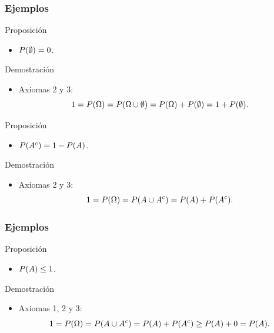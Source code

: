 \documentclass[table]{beamer}
\begin{document}
\begin{frame}
    \frametitle{Ejemplos}
    \begin{block}{Proposición}
        \begin{itemize}
            \item $\prob{\emptyset} = 0$.
        \end{itemize}
    \end{block}
    \begin{block}{Demostración}
        \begin{itemize}
            \item Axiomas 2 y 3:
                \begin{equation*}
                    1 = \prob{\Omega} = \prob{\Omega \cup \emptyset} = \prob{\Omega} + \prob{\emptyset} = 1 + \prob{\emptyset} .
                \end{equation*}
        \end{itemize}
    \end{block}
    \begin{block}{Proposición}
        \begin{itemize}
            \item $\prob{A^{c}} = 1 - \prob{A}$.
        \end{itemize}
    \end{block}
    \begin{block}{Demostración}
        \begin{itemize}
            \item Axiomas 2 y 3:
                \begin{equation*}
                    1 = \prob{\Omega} = \prob{A \cup A^{c}} = \prob{A} + \prob{A^{c}} .
                \end{equation*}
        \end{itemize}
    \end{block}
\end{frame}

\begin{frame}
    \frametitle{Ejemplos}
    \begin{block}{Proposición}
        \begin{itemize}
            \item $\prob{A} \leq 1$.
        \end{itemize}
    \end{block}
    \begin{block}{Demostración}
        \begin{itemize}
            \item Axiomas 1, 2 y 3:
                \begin{equation*}
                    1 = \prob{\Omega} = \prob{A \cup A^{c}} = \prob{A} + \prob{A^{c}} \geq \prob{A} + 0 = \prob{A} .
                \end{equation*}
        \end{itemize}
    \end{block}
\end{frame}
\end{document}
